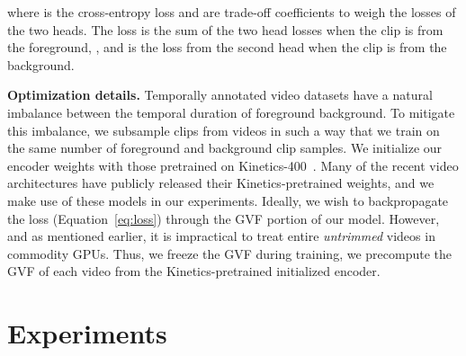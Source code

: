 \documentclass[10pt,twocolumn,letterpaper]{article}
\begin{document}
\noindent where  is the cross-entropy loss and  are trade-off coefficients to weigh the losses of the two heads. The loss is the sum of the two head losses when the clip is from the foreground, \ie , and is the loss from the second head when the clip is from the background. 

\vspace{3pt}\noindent\textbf{Optimization details.}  
Temporally annotated video datasets have a natural imbalance between the temporal duration of foreground \vs background. To mitigate this imbalance, we subsample clips from videos in such a way that we train on the same number of foreground and background clip samples. 
We initialize our encoder weights with those pretrained on Kinetics-400~\cite{dataset_kinetics}. Many of the recent video architectures have publicly released their Kinetics-pretrained weights, and we make use of these models in our experiments. Ideally, we wish to backpropagate the loss (Equation~\ref{eq:loss}) through the GVF portion of our model. However, and as mentioned earlier, it is impractical to treat entire \emph{untrimmed} videos in commodity GPUs. Thus, we freeze the GVF during training, \ie we precompute the GVF of each video from the Kinetics-pretrained initialized encoder. 

 \section{Experiments}\label{sec:experiments}
\end{document}
